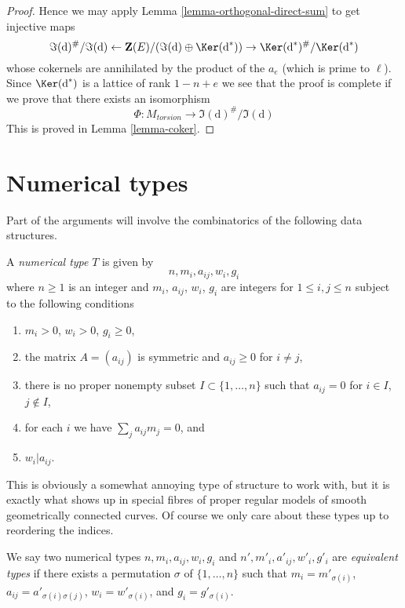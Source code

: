 \begin{proof}
\medskip\noindent
Hence we may apply Lemma \ref{lemma-orthogonal-direct-sum}
to get injective maps
$$
\Im(\text{d})^\#/\Im(\text{d}) \leftarrow
\mathbf{Z}(E)/(\Im(\text{d}) \oplus \Ker(\text{d}^*)) \rightarrow
\Ker(\text{d}^*)^\#/\Ker(\text{d}^*)
$$
whose cokernels are annihilated by the product of the $a_e$
(which is prime to $\ell$). Since $\Ker(\text{d}^*)$ is
a lattice of rank $1 - n + e$ we see that the proof is complete
if we prove that there exists an isomorphism
$$
\Phi : M_{torsion} \longrightarrow \Im(\text{d})^\#/\Im(\text{d})
$$
This is proved in Lemma \ref{lemma-coker}.
\end{proof}









\section{Numerical types}
\label{section-numerical-types}

\noindent
Part of the arguments will involve the combinatorics of the following
data structures.

\begin{definition}
\label{definition-type}
A {\it numerical type} $T$ is given by
$$
n, m_i, a_{ij}, w_i, g_i
$$
where $n \geq 1$ is an integer and $m_i$, $a_{ij}$, $w_i$, $g_i$
are integers for $1 \leq i, j \leq n$ subject to the following conditions
\begin{enumerate}
\item $m_i > 0$, $w_i > 0$, $g_i \geq 0$,
\item the matrix $A = (a_{ij})$ is symmetric and $a_{ij} \geq 0$
for $i \not = j$,
\item there is no proper nonempty subset $I \subset \{1, \ldots, n\}$
such that $a_{ij} = 0$ for $i \in I$, $j \not \in I$,
\item for each $i$ we have $\sum_j a_{ij}m_j = 0$, and
\item $w_i | a_{ij}$.
\end{enumerate}
\end{definition}

\noindent
This is obviously a somewhat annoying type of structure to work with,
but it is exactly what shows up in special fibres of proper regular
models of smooth geometrically connected curves.
Of course we only care about these types up to reordering the indices.

\begin{definition}
\label{definition-type-equivalent}
We say two numerical types $n, m_i, a_{ij}, w_i, g_i$ and
$n', m'_i, a'_{ij}, w'_i, g'_i$ are {\it equivalent types} if
there exists a permutation $\sigma$ of $\{1, \ldots, n\}$
such that $m_i = m'_{\sigma(i)}$, $a_{ij} = a'_{\sigma(i)\sigma(j)}$,
$w_i = w'_{\sigma(i)}$, and $g_i = g'_{\sigma(i)}$.
\end{definition}

